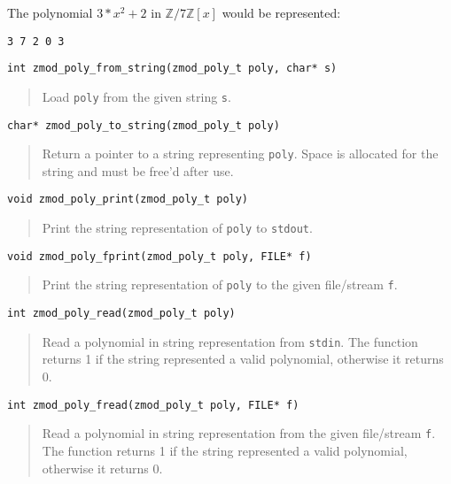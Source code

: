 \documentclass[a4paper,10pt]{article}
\newcommand{\Z}{\mathbb{Z}}
\newcommand{\code}{\lstinline}
\begin{document}
The polynomial $3*x^2+2$ in $\Z/7\Z[x]$ would be represented:

\begin{lstlisting}
3 7 2 0 3
\end{lstlisting}

\begin{lstlisting}
int zmod_poly_from_string(zmod_poly_t poly, char* s)
\end{lstlisting}
\begin{quote}
Load \code{poly} from the given string \code{s}.
\end{quote}

\begin{lstlisting}
char* zmod_poly_to_string(zmod_poly_t poly)
\end{lstlisting}
\begin{quote}
Return a pointer to a string representing \code{poly}. Space is allocated for the string and must be free'd after use.
\end{quote}

\begin{lstlisting}
void zmod_poly_print(zmod_poly_t poly)
\end{lstlisting}
\begin{quote}
Print the string representation of \code{poly} to \code{stdout}.
\end{quote}

\begin{lstlisting}
void zmod_poly_fprint(zmod_poly_t poly, FILE* f)
\end{lstlisting}
\begin{quote}
Print the string representation of \code{poly} to the given file/stream \code{f}.
\end{quote}

\begin{lstlisting}
int zmod_poly_read(zmod_poly_t poly)
\end{lstlisting}
\begin{quote}
Read a polynomial in string representation from \code{stdin}. The function returns 1 if the string represented a valid polynomial, otherwise it returns 0.
\end{quote}

\begin{lstlisting}
int zmod_poly_fread(zmod_poly_t poly, FILE* f)
\end{lstlisting}
\begin{quote}
Read a polynomial in string representation from the given file/stream \code{f}. The function returns 1 if the string represented a valid polynomial, otherwise it returns 0.
\end{quote}
\end{document}
